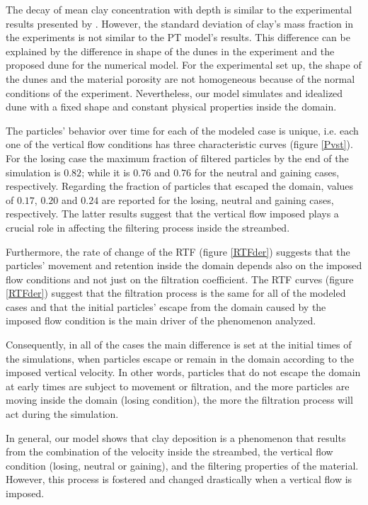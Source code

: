\documentclass[draft,linenumbers]{agujournal2018}
\begin{document}
The decay of mean clay concentration with depth is similar to the experimental results presented by \citet{Fox2018}. However, the standard deviation of clay's mass fraction in the experiments is not similar to the PT model's results. This difference can be explained by the difference in shape of the dunes in the experiment and the proposed dune for the numerical model. For the experimental set up, the shape of the dunes and the material porosity are not homogeneous because of the normal conditions of the experiment. Nevertheless, our model simulates and idealized dune with a fixed shape and constant physical properties inside the domain.   

The particles' behavior over time for each of the modeled case is unique, i.e. each one of the vertical flow conditions has three characteristic curves (figure \ref{Pvst}). For the losing case the maximum fraction of filtered particles by the end of the simulation is $0.82$; while it is $0.76$ and $0.76$ for the neutral and gaining cases, respectively. Regarding the fraction of particles that escaped the domain, values of $0.17$, $0.20$ and $0.24$ are reported for the losing, neutral and gaining cases, respectively. The latter results suggest that the vertical flow imposed plays a crucial role in affecting the filtering process inside the streambed. 

Furthermore, the rate of change of the RTF (figure \ref{RTFder}) suggests that the particles' movement and retention inside the domain depends also on the imposed flow conditions and not just on the filtration coefficient. The RTF curves (figure \ref{RTFder}) suggest that the filtration process is the same for all of the modeled cases and that the initial particles' escape from the domain caused by the imposed flow condition is the main driver of the phenomenon analyzed. 

Consequently, in all of the cases the main difference is set at the initial times of the simulations, when particles escape or remain in the domain according to the imposed vertical velocity. In other words, particles that do not escape the domain at early times are subject to movement or filtration, and the more particles are moving inside the domain (losing condition), the more the filtration process will act during the simulation. 

In general, our model shows that clay deposition is a phenomenon that results from the combination of the velocity inside the streambed, the vertical flow condition (losing, neutral or gaining), and the filtering properties of the material. However, this process is fostered and changed drastically when a vertical flow is imposed. 
\end{document}
